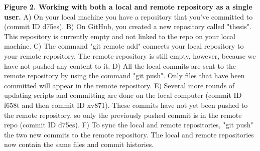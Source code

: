\textbf{Figure 2. Working with both a local and remote repository as a single user.} A) On your local machine you have a repository that you've committed to (commit ID d75es). B) On GitHub, you created a new repository called "thesis". This repository is currently empty and not linked to the repo on your local machine. C) The command "git remote add" connects your local repository to your remote repository. The remote repository is still empty, however, because we have not pushed any content to it. D) All the local commits are sent to the remote repository by using the command "git push". Only files that have been committed will appear in the remote repository. E) Several more rounds of updating scripts and committing are done on the local computer (commit ID f658t and then commit ID xv871). These commits have not yet been pushed to the remote repository, so only the previously pushed commit is in the remote repo (commit ID d75es). F) To sync the local and remote repositories, "git push" the two new commits to the remote repository. The local and remote repositories now contain the same files and commit histories. 